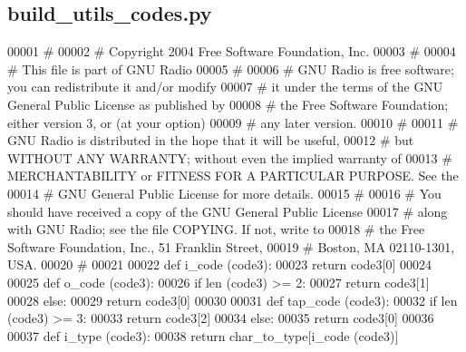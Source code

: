 \subsection{build\+\_\+utils\+\_\+codes.\+py}
\label{build__utils__codes_8py_source}

\begin{DoxyCode}
00001 \textcolor{comment}{#}
00002 \textcolor{comment}{# Copyright 2004 Free Software Foundation, Inc.}
00003 \textcolor{comment}{#}
00004 \textcolor{comment}{# This file is part of GNU Radio}
00005 \textcolor{comment}{#}
00006 \textcolor{comment}{# GNU Radio is free software; you can redistribute it and/or modify}
00007 \textcolor{comment}{# it under the terms of the GNU General Public License as published by}
00008 \textcolor{comment}{# the Free Software Foundation; either version 3, or (at your option)}
00009 \textcolor{comment}{# any later version.}
00010 \textcolor{comment}{#}
00011 \textcolor{comment}{# GNU Radio is distributed in the hope that it will be useful,}
00012 \textcolor{comment}{# but WITHOUT ANY WARRANTY; without even the implied warranty of}
00013 \textcolor{comment}{# MERCHANTABILITY or FITNESS FOR A PARTICULAR PURPOSE.  See the}
00014 \textcolor{comment}{# GNU General Public License for more details.}
00015 \textcolor{comment}{#}
00016 \textcolor{comment}{# You should have received a copy of the GNU General Public License}
00017 \textcolor{comment}{# along with GNU Radio; see the file COPYING.  If not, write to}
00018 \textcolor{comment}{# the Free Software Foundation, Inc., 51 Franklin Street,}
00019 \textcolor{comment}{# Boston, MA 02110-1301, USA.}
00020 \textcolor{comment}{#}
00021 
00022 \textcolor{keyword}{def }i_code (code3):
00023     \textcolor{keywordflow}{return} code3[0]
00024 
00025 \textcolor{keyword}{def }o_code (code3):
00026     \textcolor{keywordflow}{if} len (code3) >= 2:
00027         \textcolor{keywordflow}{return} code3[1]
00028     \textcolor{keywordflow}{else}:
00029         \textcolor{keywordflow}{return} code3[0]
00030 
00031 \textcolor{keyword}{def }tap_code (code3):
00032     \textcolor{keywordflow}{if} len (code3) >= 3:
00033         \textcolor{keywordflow}{return} code3[2]
00034     \textcolor{keywordflow}{else}:
00035         \textcolor{keywordflow}{return} code3[0]
00036 
00037 \textcolor{keyword}{def }i_type (code3):
00038     \textcolor{keywordflow}{return} char\_to\_type[i\_code (code3)]

\end{DoxyCode}
